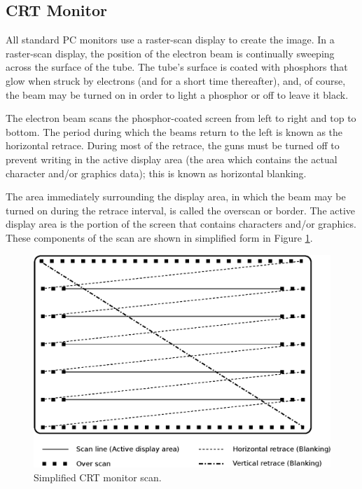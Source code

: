 \documentclass[book.tex]{subfiles}
\begin{document}
\subsection{CRT Monitor}
All standard PC monitors use a raster-scan display to create the image.
In a raster-scan display, the position of the electron beam is continually sweeping across the surface of the tube. The tube's surface is coated with phosphors that glow when struck by electrons (and for a short time thereafter), and, of course, the beam may be turned on in order to light a phosphor or off to leave it black.\\
\par

The electron beam scans the phosphor-coated screen from left to right and
top to bottom. The period during which the beams return to the left is known as
the horizontal retrace. During most of the retrace, the guns must be turned off
to prevent writing in the active display area (the area which contains the actual
character and/or graphics data); this is known as horizontal blanking.\\

\par
The area immediately surrounding the display area, in which the beam may be turned on
during the retrace interval, is called the overscan or border. The active display
area is the portion of the screen that contains characters and/or graphics. These
components of the scan are shown in simplified form in Figure \ref{fig:monitor}.\\

\begin{figure}[H]
\centering
\includegraphics[width=\textwidth]{imgs/drawings/monitor.eps}
\caption{Simplified CRT monitor scan.}
\label{fig:monitor}
\end{figure}
\end{document}
